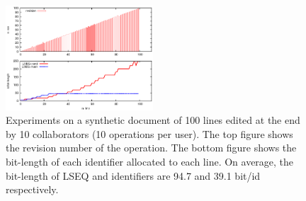 \begin{figure}
\centering
\includegraphics[width=0.49\textwidth]{img/tenusers.eps}
\caption{Experiments on a synthetic document of 100 lines edited at the end by
  10 collaborators (10 operations per user). The top figure shows the revision
  number of the operation. The bottom figure shows the bit-length of each
  identifier allocated to each line. On average, the bit-length of LSEQ and
  \NAME{} identifiers are 94.7 and 39.1 bit/id respectively.}
\label{im:tenusers}
\end{figure}


